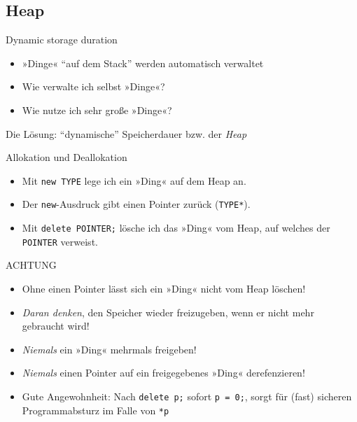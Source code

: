 \subsection{Heap}

\begin{frame}{Dynamic storage duration}
	\begin{itemize}[<+->]
		\item »Dinge« \enquote{auf dem Stack} werden automatisch verwaltet
		\item Wie verwalte ich selbst »Dinge«?
		\item Wie nutze ich sehr große »Dinge«?
	\end{itemize}
	
	\vspace{2em}
	
	\uncover<+->
	{
		Die Lösung: \enquote{dynamische} Speicherdauer bzw. der \emph{Heap}
	}
\end{frame}

\begin{frame}[fragile]{Allokation und Deallokation}
	\begin{itemize}[<+->]
		\item Mit \verb|new TYPE| lege ich ein »Ding« auf dem Heap an.
		\item Der \verb|new|-Ausdruck gibt einen Pointer zurück (\verb|TYPE*|).
		\item Mit \verb|delete POINTER;| lösche ich das »Ding« vom Heap, auf welches der \verb|POINTER| verweist.
	\end{itemize}
	
		\begin{block}{ACHTUNG}
			\begin{itemize}[<+-| alert@+>]
				\item Ohne einen Pointer lässt sich ein »Ding« nicht vom Heap löschen!
				\item \emph{Daran denken}, den Speicher wieder freizugeben, wenn er nicht mehr gebraucht wird!
				\item \emph{Niemals} ein »Ding« mehrmals freigeben!
				\item \emph{Niemals} einen Pointer auf ein freigegebenes »Ding« derefenzieren!
				\item Gute Angewohnheit: Nach \verb|delete p;| sofort \verb|p = 0;|, sorgt für (fast) sicheren Programmabsturz im Falle von \verb|*p|
			\end{itemize}
		\end{block}
\end{frame}

